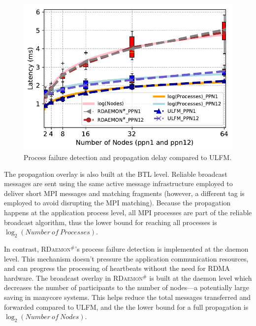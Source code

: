 \documentclass[5p,times,twocolumn]{elsarticle}
\newcommand{\ulfm}[0]{\textsc{ULFM}\xspace}
\newcommand{\mpi}[0]{\textsc{MPI}\xspace}
\newcommand{\ourwork}[0]{\textsc{RDaemon}\ensuremath{^\#}\xspace}
\begin{document}
\begin{figure}[h]
  \centering
  \includegraphics[width=\linewidth]{review_Process_Failure_comparision.pdf}\vspace{-1em}
  \caption{Process failure detection and propagation delay compared to \ulfm.}
  \label{fig:proc.failure.nacl}
\end{figure}
The propagation overlay is also built at the BTL level. Reliable broadcast
messages are sent using the same active message infrastructure employed to
deliver short \mpi messages and matching fragments (however, a different
tag is employed to avoid disrupting the \mpi matching). Because the
propagation happens at the application process level, all \mpi processes
are part of the reliable broadcast algorithm, thus the lower bound for reaching
all processes is $\log_2({Number\ of\ Processes})$.

In contrast, \ourwork's process failure detection is implemented at the daemon
level. This mechanism doesn't pressure the application communication resources,
and can progress the processing of heartbeats without the need for
RDMA hardware. The broadcast overlay in \ourwork is built at the daemon
level which decreases the number of participants to the number of nodes---a potentially
large saving in manycore systems. This helps reduce
the total messages transferred and forwarded compared to \ulfm, and the
 the lower bound for a full propagation is $\log_2({Number\ of\ Nodes})$.

\end{document}
